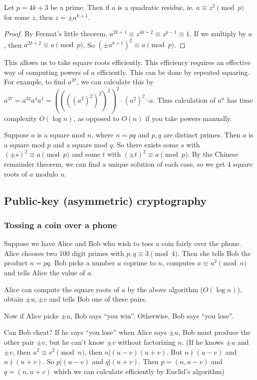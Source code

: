 \documentclass[a4paper]{article}
\begin{document}
\begin{prop}
  Let $p = 4k + 3$ be a prime. Then if $a$ is a quadratic residue, ie. $a \equiv z^2 \pmod p$ for some $z$, then $z = \pm a^{k + 1}$.
\end{prop}

\begin{proof}
  By Fermat's little theorem, $a^{2k + 1} \equiv z^{4k + 2} \equiv z^{p - 1} \equiv 1$. If we multiply by $a$, then $a^{2k + 2} \equiv a \pmod p$. So $(\pm a^{k + 1})^2 \equiv a \pmod p$.
\end{proof}
This allows us to take square roots efficiently. This efficiency requires an effective way of computing powers of $a$ efficiently. This can be done by repeated squaring. For example, to find $a^{37}$, we can calculate this by $a^{37} = a^{32}a^4a^1 = ((((a^2)^2)^2)^2)^2 \cdot (a^2)^2\cdot a$. Thus calculation of $a^n$ has time complexity $O(\log n)$, as opposed to $O(n)$ if you take powers manually.

Suppose $a$ is a square mod $n$, where $n = pq$ and $p, q$ are distinct primes. Then $a$ is a square mod $p$ and a square mod $q$. So there exists some $s$ with $(\pm s)^2 \equiv a\pmod p$ and some $t$ with $(\pm t)^2\equiv a\pmod p$. By the Chinese remainder theorem, we can find a unique solution of each case, so we get 4 square roots of $a$ modulo $n$.

\subsection{Public-key (asymmetric) cryptography}
\subsubsection*{Tossing a coin over a phone}
Suppose we have Alice and Bob who wish to toss a coin fairly over the phone. Alice chooses two 100 digit primes with $p, q\equiv 3\pmod 4$. Then she tells Bob the product $n = pq$. Bob picks a number $u$ coprime to $n$, computes $a\equiv u^2\pmod n$ and tells Alice the value of $a$.

Alice can compute the square roots of $a$ by the above algorithm ($O(\log n)$), obtain $\pm u, \pm v$ and tells Bob one of these pairs.

Now if Alice picks $\pm u$, Bob says ``you win''. Otherwise, Bob says ``you lose''.

Can Bob cheat? If he says ``you lose'' when Alice says $\pm u$, Bob must produce the other pair $\pm v$, but he can't know $\pm v$ without factorizing $n$. (If he knows $\pm u$ and $\pm v$, then $u^2 \equiv v^2\pmod n$, then $n | (u - v)(u + v)$. But $n\nmid (u - v)$ and $n\nmid (u + v)$. So $p | (u - v)$ and $q | (u + v)$. Then $p = (n, u - v)$ and $q = (n, u + v)$ which we can calculate efficiently by Euclid's algorithm)
\end{document}
